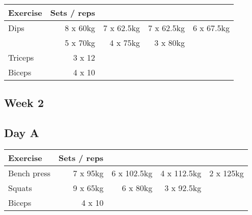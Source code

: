 \documentclass[12pt, a4paper]{article}%
\begin{document}
  \begin{tabular}{l|rrrr}
  \hspace{0.75em} \textbf{Exercise} & \textbf{Sets / reps} \\ \hline

            \hspace{0.75em} Dips
            & 8 x 60kg
            & 7 x 62.5kg
            & 7 x 62.5kg
            & 6 x 67.5kg
            \\


            \hspace{0.75em}
            & 5 x 70kg
            & 4 x 75kg
            & 3 x 80kg
            & 
            \\


   \hspace{0.75em} Triceps & 3 x 12 \\
   \hspace{0.75em} Biceps & 4 x 10 \\
  \end{tabular}

 \subsection*{\hspace{0.25em} Week 2 }
  \subsection*{\hspace{0.5em} Day A }


  \begin{tabular}{l|rrrr}
  \hspace{0.75em} \textbf{Exercise} & \textbf{Sets / reps} \\ \hline

            \hspace{0.75em} Bench press
            & 7 x 95kg
            & 6 x 102.5kg
            & 4 x 112.5kg
            & 2 x 125kg
            \\


            \hspace{0.75em} Squats
            & 9 x 65kg
            & 6 x 80kg
            & 3 x 92.5kg
            & 
            \\


   \hspace{0.75em} Biceps & 4 x 10 \\
  \end{tabular}
\end{document}
